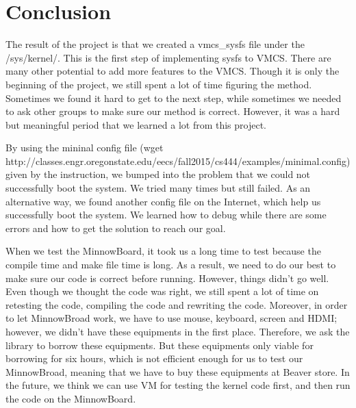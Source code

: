 \documentclass[10pt,draftclsnofoot,journal,compsoc,onecolumn]{IEEEtran}
\begin{document}
\section{Conclusion}
	\par The result of the project is that we created a vmcs\_sysfs file under the /sys/kernel/. This is the first step of implementing sysfs to VMCS. There are many other potential to add more features to the VMCS. Though it is only the beginning of the project, we still spent a lot of time figuring the method. Sometimes we found it hard to get to the next step, while sometimes we needed to ask other groups to make sure our method is correct. However, it was a hard but meaningful period that we learned a lot from this project.
	\par By using the mininal config file (wget http://classes.engr.oregonstate.edu/eecs/fall2015/cs444/examples/minimal.config) given by the instruction, we bumped into the problem that we could not successfully boot the system. We tried many times but still failed. As an alternative way, we found another config file on the Internet, which help us successfully boot the system. We learned how to debug while there are some errors and how to get the solution to reach our goal.
    \par When we test the MinnowBoard, it took us a long time to test because the compile time and make file time is long. As a result, we need to do our best to make sure our code is correct before running. However, things didn't go well. Even though we thought the code was right, we still spent a lot of time on retesting the code, compiling the code and rewriting the code. Moreover, in order to let MinnowBroad work, we have to use mouse, keyboard, screen and HDMI; however, we didn't have these equipments in the first place. Therefore, we ask the library to borrow these equipments. But these equipments only viable for borrowing for six hours, which is not efficient enough for us to test our MinnowBroad, meaning that we have to buy these equipments at Beaver store. In the future, we think we can use VM for testing the kernel code first, and then run the code on the MinnowBoard.    
\end{document}
